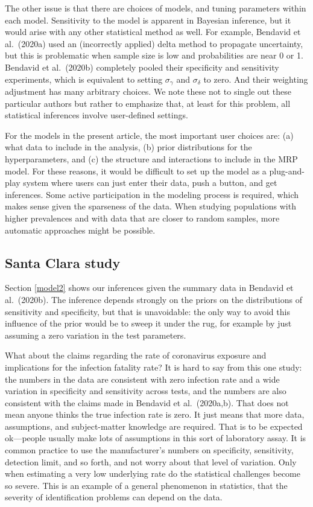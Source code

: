 \documentclass[11pt]{article}
\begin{document}
The other issue is that there are choices of models, and tuning
parameters within each model.  Sensitivity to the model is apparent in
Bayesian inference, but it would arise with any other statistical
method as well.  For example, Bendavid et al.\ (2020a) used an
(incorrectly applied) delta method to propagate uncertainty, but this
is problematic when sample size is low and probabilities are near 0 or
1.  Bendavid et al.\ (2020b) completely pooled their specificity and
sensitivity experiments, which is equivalent to setting
$\sigma_{\gamma}$ and $\sigma_{\delta}$ to zero.  And their weighting
adjustment has many arbitrary choices.  We note these not to single
out these particular authors but rather to emphasize that, at least
for this problem, all statistical inferences involve user-defined
settings.

For the models in the present article, the most important user choices
are: (a) what data to include in the analysis, (b) prior distributions
for the hyperparameters, and (c) the structure and interactions to
include in the MRP model.  For these reasons, it would be difficult to
set up the model as a plug-and-play system where users can just enter
their data, push a button, and get inferences.  Some active
participation in the modeling process is required, which makes sense
given the sparseness of the data.  When studying populations with
higher prevalences and with data that are closer to random samples,
more automatic approaches might be possible.

\subsection{Santa Clara study}

Section \ref{model2} shows our inferences given the summary data in
Bendavid et al.\ (2020b).  The inference depends strongly on the
priors on the distributions of sensitivity and specificity, but that
is unavoidable: the only way to avoid this influence of the prior
would be to sweep it under the rug, for example by just assuming a
zero variation in the test parameters.

What about the claims regarding the rate of coronavirus exposure and
implications for the infection fatality rate?  It is hard to say from
this one study: the numbers in the data are consistent with zero
infection rate and a wide variation in specificity and sensitivity
across tests, and the numbers are also consistent with the claims made
in Bendavid et al.\ (2020a,b). That does not mean anyone thinks the
true infection rate is zero.  It just means that more data,
assumptions, and subject-matter knowledge are required. That is to be
expected ok---people usually make lots of assumptions in this sort of
laboratory assay. It is common practice to use the manufacturer's
numbers on specificity, sensitivity, detection limit, and so forth,
and not worry about that level of variation. Only when estimating a
very low underlying rate do the statistical challenges become so
severe. This is an example of a general phenomenon in statistics, that
the severity of identification problems can depend on the data.
\end{document}
